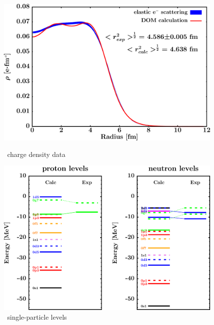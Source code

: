\begin{figure}[H]
    \centering
    \begin{minipage}{0.45\textwidth}
        \centering
        \includegraphics[width=1.0\textwidth]{figures/sn112_chargeDensity.png}
        \caption{\snTwelve\ charge density data}
        \label{DOMFitData_sn112_chargeDensity}
    \end{minipage}\hfill
    \begin{minipage}{0.45\textwidth}
        \centering
        \includegraphics[width=1.0\textwidth]{figures/sn112_SPLevels.png}
        \caption{\snTwelve\ single-particle levels}
        \label{DOMFitData_sn112_SPLevels}
    \end{minipage}
\end{figure}

\afterpage{\clearpage}

